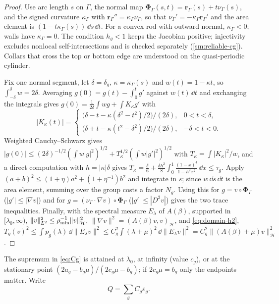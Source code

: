 \begin{proof}
Use arc length $s$ on $\Gamma$, the normal map
$\boldsymbol\Phi_\Gamma(s,t)=\boldsymbol r_\Gamma(s)+t\nu_\Gamma(s)$, and the signed
curvature $\kappa_\Gamma$ with $\boldsymbol r_\Gamma''=\kappa_\Gamma\nu_\Gamma$, so that
$\nu_\Gamma'=-\kappa_\Gamma\boldsymbol r_\Gamma'$ and the area element is
$(1-t\kappa_\Gamma(s))\,\dd s\,\dd t$. For a convex rod with outward normal,
$\kappa_\Gamma<0$; walls have $\kappa_\Gamma=0$. The condition $h_g<1$ keeps the
Jacobian positive; injectivity excludes nonlocal self-intersections and is checked
separately (\cref{sm:reliable-cg}). Collars that cross the top or bottom edge are
understood on the quasi-periodic cylinder.

Fix one normal segment, let $\delta=\delta_g$, $\kappa=\kappa_\Gamma(s)$ and
$w(t)=1-\kappa t$, so $\int_{-\delta}^{\delta}w=2\delta$. Averaging
$g(0)=g(t)-\int_0^tg'$ against $w(t)\,\dd t$ and exchanging the integrals gives
$g(0)=\frac1{2\delta}\int wg+\int K_\kappa g'$ with
\[
  |K_\kappa(t)|=\begin{cases}
  \bigl(\delta-t-\kappa(\delta^2-t^2)/2\bigr)/(2\delta),&0<t<\delta,\\
  \bigl(\delta+t-\kappa(t^2-\delta^2)/2\bigr)/(2\delta),&-\delta<t<0.
  \end{cases}
\]
Weighted Cauchy--Schwarz gives $|g(0)|\le(2\delta)^{-1/2}(\int w|g|^2)^{1/2}
+T_\kappa^{1/2}(\int w|g'|^2)^{1/2}$ with $T_\kappa=\int|K_\kappa|^2/w$, and a direct
computation with $h=|\kappa|\delta$ gives
$T_\kappa=\frac\delta6+\frac{\delta h^2}8\int_0^1\frac{(1-x)^4}{1-h^2x^2}\,\dd x\le\tau_g$.
Apply $(a+b)^2\le(1+\eta)a^2+(1+\eta^{-1})b^2$ and integrate in $s$; since
$w\,\dd s\,\dd t$ is the area element, summing over the group costs a factor $N_g$.
Using this for $g=v\circ\boldsymbol\Phi_\Gamma$ ($|g'|\le|\nabla v|$) and for
$g=(\nu_\Gamma\cdot\nabla v)\circ\boldsymbol\Phi_\Gamma$ ($|g'|\le|D^2v|$) gives the
two trace inequalities. Finally, with the spectral measure $E_\lambda$ of
$A(\beta)$, supported in $[\lambda_0,\infty)$, $\|v\|^2_{L^2}\le\rho_{\min}^{-1}\|v\|^2_{\mathcal H}$,
$\|\nabla v\|^2=(A(\beta)v,v)_{\mathcal H}$, and \eqref{eq:domain-h2},
$T_g(v)^2\le\int p_g(\lambda)\,\dd\|E_\lambda v\|^2\le C_g^2\int(\lambda+\mu)^2\,
\dd\|E_\lambda v\|^2=C_g^2\|(A(\beta)+\mu)v\|^2_{\mathcal H}$.
\end{proof}

The supremum in
\eqref{eq:Cg} is attained at $\lambda_0$, at infinity (value $c_g$), or at the
stationary point $(2a_g-b_g\mu)/(2c_g\mu-b_g)$; if $2c_g\mu=b_g$ only the
endpoints matter. Write
\begin{equation}\label{eq:Q}
  Q=\sum_gC_g\varepsilon_g .
\end{equation}

